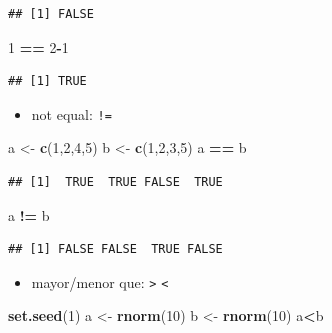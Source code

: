 \documentclass[]{book}
\newenvironment{Shaded}{\begin{snugshade}}{\end{snugshade}}
\newcommand{\KeywordTok}[1]{\textcolor[rgb]{0.13,0.29,0.53}{\textbf{#1}}}
\newcommand{\DecValTok}[1]{\textcolor[rgb]{0.00,0.00,0.81}{#1}}
\newcommand{\StringTok}[1]{\textcolor[rgb]{0.31,0.60,0.02}{#1}}
\newcommand{\OperatorTok}[1]{\textcolor[rgb]{0.81,0.36,0.00}{\textbf{#1}}}
\newcommand{\NormalTok}[1]{#1}
\providecommand{\tightlist}{%
  \setlength{\itemsep}{0pt}\setlength{\parskip}{0pt}}
\begin{document}
\begin{verbatim}
## [1] FALSE
\end{verbatim}

\begin{Shaded}
\begin{Highlighting}[]
   \DecValTok{1} \OperatorTok{==}\StringTok{ }\DecValTok{2}\OperatorTok{-}\DecValTok{1}
\end{Highlighting}
\end{Shaded}

\begin{verbatim}
## [1] TRUE
\end{verbatim}

\begin{itemize}
\tightlist
\item
  not equal: \texttt{!=}
\end{itemize}

\begin{Shaded}
\begin{Highlighting}[]
\NormalTok{    a <-}\StringTok{ }\KeywordTok{c}\NormalTok{(}\DecValTok{1}\NormalTok{,}\DecValTok{2}\NormalTok{,}\DecValTok{4}\NormalTok{,}\DecValTok{5}\NormalTok{)}
\NormalTok{    b <-}\StringTok{ }\KeywordTok{c}\NormalTok{(}\DecValTok{1}\NormalTok{,}\DecValTok{2}\NormalTok{,}\DecValTok{3}\NormalTok{,}\DecValTok{5}\NormalTok{) }
\NormalTok{    a }\OperatorTok{==}\StringTok{ }\NormalTok{b}
\end{Highlighting}
\end{Shaded}

\begin{verbatim}
## [1]  TRUE  TRUE FALSE  TRUE
\end{verbatim}

\begin{Shaded}
\begin{Highlighting}[]
\NormalTok{    a }\OperatorTok{!=}\StringTok{ }\NormalTok{b}
\end{Highlighting}
\end{Shaded}

\begin{verbatim}
## [1] FALSE FALSE  TRUE FALSE
\end{verbatim}

\begin{itemize}
\tightlist
\item
  mayor/menor que: \texttt{\textgreater{}} \texttt{\textless{}}
\end{itemize}

\begin{Shaded}
\begin{Highlighting}[]
\KeywordTok{set.seed}\NormalTok{(}\DecValTok{1}\NormalTok{)}
\NormalTok{a <-}\StringTok{ }\KeywordTok{rnorm}\NormalTok{(}\DecValTok{10}\NormalTok{)}
\NormalTok{b <-}\StringTok{ }\KeywordTok{rnorm}\NormalTok{(}\DecValTok{10}\NormalTok{)}
\NormalTok{a}\OperatorTok{<}\NormalTok{b}
\end{Highlighting}
\end{Shaded}
\end{document}
